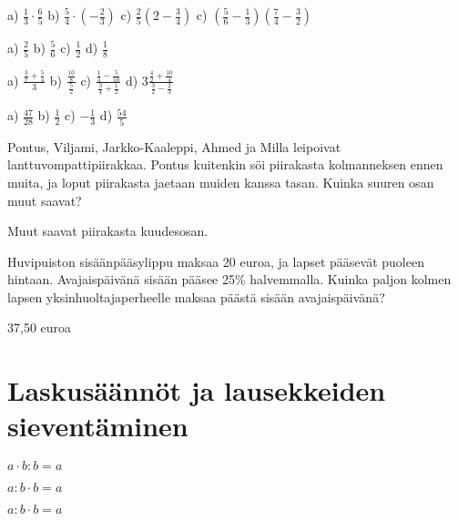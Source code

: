 \begin{tehtava}
    a) $\frac{1}{3} \cdot \frac{6}{5}$
    b) $\frac{5}{4} \cdot (-\frac{2}{3})$
    c) $\frac{2}{5} (2 - \frac{3}{4})$
    c) $(\frac{5}{6} - \frac{1}{3})(\frac{7}{4} - \frac{3}{2})$
    
    \begin{vastaus}
        a) $\frac{2}{5}$
        b) $\frac{5}{6}$
        c) $\frac{1}{2}$
        d) $\frac{1}{8}$
    \end{vastaus}
\end{tehtava}

\begin{tehtava} %
    a) $ \frac{\frac{3}{7} + \frac{5}{4}}{3}$
    b) $ \frac{\frac{10}{8}}{\frac{5}{2}}$
    c) $ \frac{\frac{1}{3} - \frac{5}{10}}{\frac{3}{4} + \frac{1}{2}}$
    d) $ 3\frac{\frac{4}{2} + \frac{10}{4}}{\frac{3}{2} - \frac{2}{3}}$
    
    \begin{vastaus}
        a) $\frac{47}{28}$
        b) $\frac{1}{2}$
        c) $-\frac{1}{3}$
        d) $\frac{54}{5}$
    \end{vastaus}
\end{tehtava}

\begin{tehtava} %
    Pontus, Viljami, Jarkko-Kaaleppi, Ahmed ja Milla leipoivat lanttuvompattipiirakkaa.
    Pontus kuitenkin söi piirakasta kolmanneksen ennen muita, ja loput piirakasta
    jaetaan muiden kanssa tasan. Kuinka suuren osan muut saavat?
    
    \begin{vastaus}
        Muut saavat piirakasta kuudesosan.
    \end{vastaus}
\end{tehtava}

\begin{tehtava} %
    Huvipuiston sisäänpääsylippu maksaa 20 euroa, ja lapset pääsevät puoleen
    hintaan. Avajaispäivänä sisään pääsee 25\% halvemmalla. Kuinka paljon kolmen
    lapsen yksinhuoltajaperheelle maksaa päästä sisään avajaispäivänä?
    
    \begin{vastaus}
        37,50 euroa
    \end{vastaus}
\end{tehtava}

\chapter{Laskusäännöt ja lausekkeiden sieventäminen}



$a\cdot b:b=a$

$a:b\cdot b=a$

$a:b\cdot b=a$
